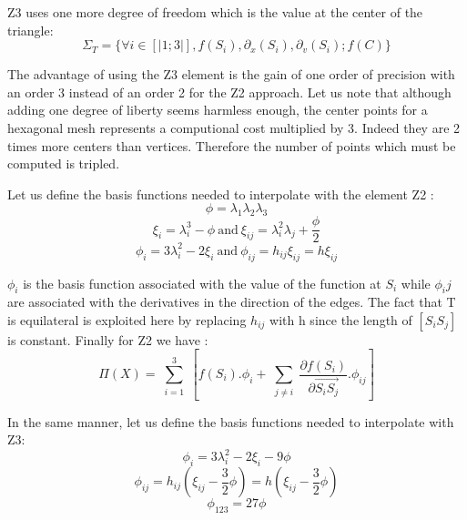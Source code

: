 \documentclass[proc]{edpsmath}
\begin{document}
 \noindent Z3 uses one more degree of freedom which is the value at the center of the triangle:
\begin{equation*}
 \Sigma_T = \lbrace \forall i \in [|1;3|], f(S_i),\partial_x(S_i),\partial_v(S_i); f(C) \rbrace 
\end{equation*}

 \noindent The advantage of using the Z3 element is the gain of one order of precision with an order 3 instead of an order 2 for the Z2 approach. Let us note that although adding one degree of liberty seems harmless enough, the center points for a hexagonal mesh represents a computional cost multiplied by 3. Indeed they are  2 times more centers than vertices. Therefore the number of points which must be computed is tripled. 
 
Let us define the basis functions needed to interpolate with the element Z2 : 
\begin{equation*}
\phi = \lambda_1 \lambda_2 \lambda_3 
\end{equation*}
\begin{equation*}
\xi _i= \lambda_i^3 - \phi ~\text{and}~ \xi_{ij}= \lambda_{i}^2 \lambda_j + \frac{\phi}{2} 
\end{equation*}
\begin{equation*}
\phi_i = 3\lambda_{i}^2 -2 \xi_i ~\text{and} ~\phi_{ij} = h_{ij} \xi_{ij}=h \xi_{ij}
\end{equation*}


\noindent $\phi_i$ is the basis function associated with the value of the function at $S_i$ while $\phi_ij$ are associated with the derivatives in the direction of the edges.    
The fact that T is equilateral is exploited here by replacing $h_{ij}$ with h since the length of $ [S_iS_j]$ is constant. Finally for Z2 we have :
\begin{equation*}
 \Pi (X) = \sum \limits_{\substack{i=1 }}^{3}{ [f(S_i).\phi_i + \sum \limits_{\substack{j\neq i }}^{}{ \frac{\partial f(S_i)}{\partial  \overrightarrow{ S_i S_j } }.\phi_{ij} } ] } 
\end{equation*}

\noindent In the same manner, let us define the basis functions needed to interpolate with Z3: 
\begin{equation*}
\phi_i = 3\lambda_{i}^2 -2 \xi_i - 9 \phi
\end{equation*}
\begin{equation*}
\phi_{ij} = h_{ij} (\xi_{ij} -\frac{3}{2}\phi)=h (\xi_{ij} -\frac{3}{2}\phi)
\end{equation*}
\begin{equation*}
\phi_{123}=27\phi
\end{equation*}
\end{document}
